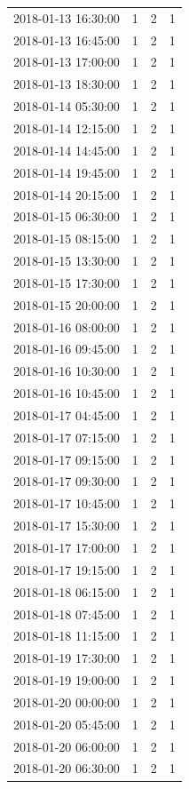\begin{tabular}{lrrr}
2018-01-13 16:30:00 & 1 & 2 & 1 \\
2018-01-13 16:45:00 & 1 & 2 & 1 \\
2018-01-13 17:00:00 & 1 & 2 & 1 \\
2018-01-13 18:30:00 & 1 & 2 & 1 \\
2018-01-14 05:30:00 & 1 & 2 & 1 \\
2018-01-14 12:15:00 & 1 & 2 & 1 \\
2018-01-14 14:45:00 & 1 & 2 & 1 \\
2018-01-14 19:45:00 & 1 & 2 & 1 \\
2018-01-14 20:15:00 & 1 & 2 & 1 \\
2018-01-15 06:30:00 & 1 & 2 & 1 \\
2018-01-15 08:15:00 & 1 & 2 & 1 \\
2018-01-15 13:30:00 & 1 & 2 & 1 \\
2018-01-15 17:30:00 & 1 & 2 & 1 \\
2018-01-15 20:00:00 & 1 & 2 & 1 \\
2018-01-16 08:00:00 & 1 & 2 & 1 \\
2018-01-16 09:45:00 & 1 & 2 & 1 \\
2018-01-16 10:30:00 & 1 & 2 & 1 \\
2018-01-16 10:45:00 & 1 & 2 & 1 \\
2018-01-17 04:45:00 & 1 & 2 & 1 \\
2018-01-17 07:15:00 & 1 & 2 & 1 \\
2018-01-17 09:15:00 & 1 & 2 & 1 \\
2018-01-17 09:30:00 & 1 & 2 & 1 \\
2018-01-17 10:45:00 & 1 & 2 & 1 \\
2018-01-17 15:30:00 & 1 & 2 & 1 \\
2018-01-17 17:00:00 & 1 & 2 & 1 \\
2018-01-17 19:15:00 & 1 & 2 & 1 \\
2018-01-18 06:15:00 & 1 & 2 & 1 \\
2018-01-18 07:45:00 & 1 & 2 & 1 \\
2018-01-18 11:15:00 & 1 & 2 & 1 \\
2018-01-19 17:30:00 & 1 & 2 & 1 \\
2018-01-19 19:00:00 & 1 & 2 & 1 \\
2018-01-20 00:00:00 & 1 & 2 & 1 \\
2018-01-20 05:45:00 & 1 & 2 & 1 \\
2018-01-20 06:00:00 & 1 & 2 & 1 \\
2018-01-20 06:30:00 & 1 & 2 & 1 \\

\end{tabular}
